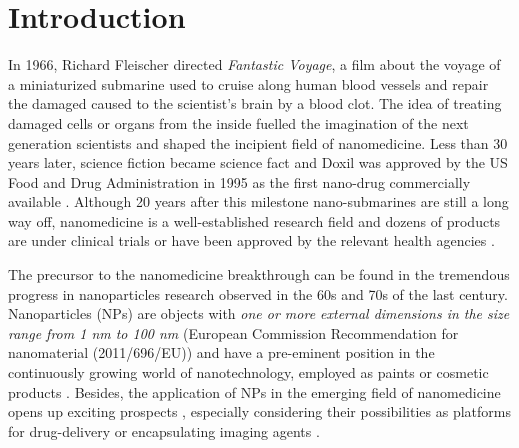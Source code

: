 \chapter{Introduction}
\label{chap:introduction}


In 1966, Richard Fleischer directed \emph{Fantastic Voyage}, a film about the voyage of a miniaturized submarine used to cruise along human blood vessels and repair the damaged caused to the scientist's brain by a blood clot. The idea of treating damaged cells or organs from the inside fuelled the imagination of the next generation scientists and shaped the incipient field of nanomedicine. Less than 30 years later, science fiction became science fact and Doxil was approved by the US Food and Drug Administration in 1995 as the first nano-drug commercially available \citep{barenholz_doxil_2012}. Although 20 years after this milestone nano-submarines are still a long way off, nanomedicine is a well-established research field and dozens of products are under clinical trials or have been approved by the relevant health agencies \citep{etheridge_big_2013}.

The precursor to the nanomedicine breakthrough can be found in the tremendous progress in nanoparticles research observed in the 60s and 70s of the last century. Nanoparticles (NPs) are objects with \emph{one or more external dimensions in the size range from 1 nm to 100 nm} (European Commission Recommendation for nanomaterial (2011/696/EU)) and have a pre-eminent position in the continuously growing world of nanotechnology, employed as paints or cosmetic products \citep{guterres_polymeric_2007}. Besides, the application of NPs in the emerging field of nanomedicine opens up exciting prospects \citep{sahoo_nanotech_2003, wickline_nanotechnology_2003, rosen_rise_2005, nie_nanotechnology_2007,zhou_nano-enabled_2014}, especially considering their possibilities as platforms for drug-delivery \citep{wang_nanoparticle_2012} or encapsulating imaging agents \citep{tao_shape-specific_2011}.

